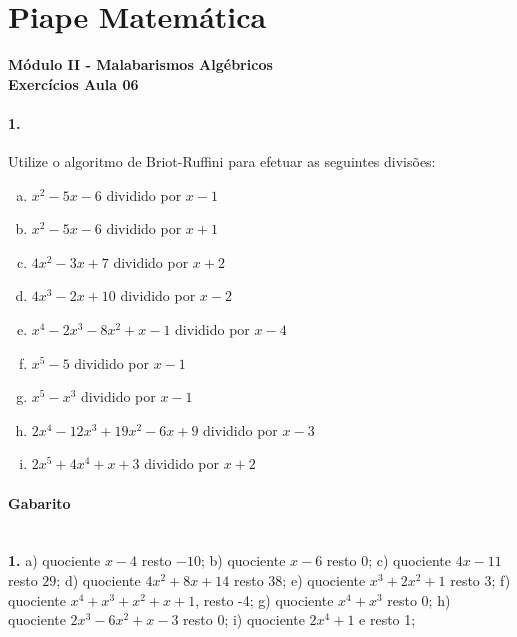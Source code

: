 \documentclass[a4paper,12pt]{article}
\begin{document}
 
  
\section*{Piape Matemática} 
\textbf{Módulo II - Malabarismos Algébricos}\\
\textbf{Exercícios Aula 06}         
\begin{multicols}{2}
\paragraph*{1.} Utilize o algoritmo de Briot-Ruffini para efetuar as seguintes divisões:
\begin{enumerate}[a)]
\item $x^2 -5x-6$ dividido por $x-1$
\item $x^2 -5x-6$ dividido por $x+1$
\item $4x^2 -3x +7$ dividido por $x+2$
\item $4x^3-2x+10$ dividido por $x-2$
\item $x^4 -2x^3 -8x^2 +x -1$ dividido por $x-4$
\item $x^5 - 5$ dividido por $x - 1$
\item $x^5 - x^3$ dividido por $x - 1$
\item $2 x^{4} - 12 x^{3} + 19 x^{2} - 6 x + 9$ dividido por $x - 3$
\item $2 x^{5} + 4 x^{4} + x + 3$ dividido por $x + 2$
\end{enumerate}
\vspace*{8cm}
\end{multicols}
 
\vspace*{\fill}
{\footnotesize \color{darkgray}
\paragraph*{Gabarito} \hspace*{\fill}\\
\textbf{1.} a) quociente $x-4$ resto $-10$; b) quociente $x-6$ resto $0$; 
c) quociente $4x-11$ resto $29$;  d) quociente $4x^2 + 8x + 14$ resto $38$;
e) quociente $x^3 + 2x^2 + 1$ resto $3$;
f) quociente $x^4 + x^3 + x^2 + x + 1 $, resto -4; g) quociente $x^4 +x^3$ resto 0; h) quociente $2x^3 - 6x^2 + x -3$ resto 0; i) quociente $2x^4 + 1$ e resto 1;  
}
\end{document}
